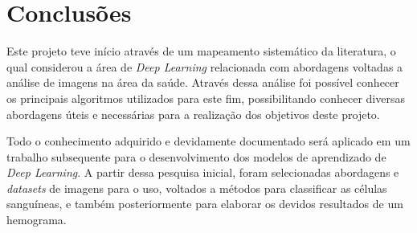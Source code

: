 \chapter{Conclusões}
\label{chap:conclusoes}

Este projeto teve início através de um mapeamento sistemático da literatura, o qual considerou a área de \emph{Deep Learning} relacionada com abordagens voltadas a análise de imagens na área da saúde. Através dessa análise foi possível conhecer os principais algoritmos utilizados para este fim, possibilitando conhecer diversas abordagens úteis e necessárias para a realização dos objetivos deste projeto.

Todo o conhecimento adquirido e devidamente documentado será aplicado em um trabalho subsequente para o desenvolvimento dos modelos de aprendizado de \emph{Deep Learning}. A partir dessa pesquisa inicial, foram selecionadas abordagens e \emph{datasets} de imagens para o uso, voltados a métodos para classificar as células sanguíneas, e também posteriormente para elaborar os devidos resultados de um hemograma.